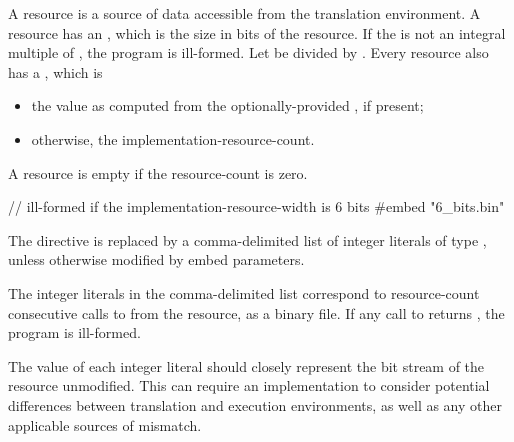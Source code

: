 \pnum
A resource is a source of data accessible from the translation environment.
A resource has an , which is the
size in bits of the resource.
If the  is not an integral multiple of
, the program is ill-formed.
Let  be
 divided by .
Every resource also has a , which is

\begin{itemize}
\item
  the value as computed from the optionally-provided 
  , if present;
\item
  otherwise, the implementation-resource-count.
\end{itemize}

A resource is empty if the resource-count is zero.

\pnum
\begin{example}
\begin{codeblock}
// ill-formed if the implementation-resource-width is 6 bits
#embed "6_bits.bin"
\end{codeblock}
\end{example}

\pnum
The  directive is replaced by a comma-delimited list of integer
literals of type , unless otherwise modified by embed
parameters.

\pnum
The integer literals in the comma-delimited list correspond to
resource-count consecutive calls to  
from the resource, as a binary file.
If any call to  returns , the program is
ill-formed.

\pnum
\recommended The value of each integer literal should closely represent
the bit stream of the resource unmodified.
This can require an implementation to consider potential differences between
translation and execution environments, as well as any other applicable
sources of mismatch.

